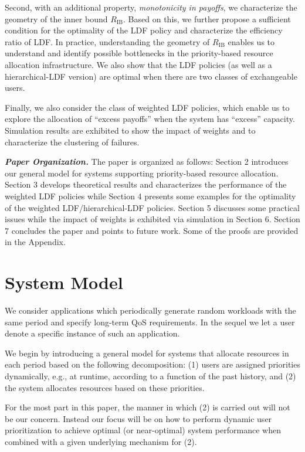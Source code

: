 \documentclass[prodmode,acmtompecs]{acmsmall}
\newcommand{\myComments}[1]{}
\newif\ifextended
\newcommand{\extendedStart}{\ifextended  \myComments{Extended version: }}
\newcommand{\commentEnd}{\myComments{End}}
\begin{document}
Second, with an additional property, {\em monotonicity in payoffs}, we characterize the geometry of the inner bound $R_\text{IB}$. 
Based on this, we further propose a sufficient condition for the optimality of the LDF policy and characterize the efficiency ratio of LDF. 
In practice, understanding the geometry of $R_\text{IB}$ enables us to understand and identify possible bottlenecks in the priority-based resource allocation infrastructure. 
We also show that the LDF policies (as well as a hierarchical-LDF version) are optimal when there are two classes of exchangeable users. 

Finally, we also consider the class of weighted LDF policies, which enable us to explore the allocation of ``excess payoffs'' when the system has ``excess'' capacity. Simulation results are exhibited to show the impact of weights and to characterize the clustering of failures. 

{\bf \em Paper Organization. }
The paper is organized as follows: Section 2 introduces our general model for systems supporting priority-based resource allocation. Section 3 develops theoretical results and characterizes the performance of the weighted LDF policies while Section 4 presents some examples for the optimality of the weighted LDF/hierarchical-LDF policies. Section 5 discusses some practical issues while the impact of weights is exhibited via simulation in Section 6. Section 7 concludes the paper and points to future work. Some of the proofs are provided in the Appendix.

\section{System Model}
\label{sec_system_model}
We consider applications which periodically generate random workloads with the same period and specify long-term QoS requirements. In the sequel we let a user denote a specific instance of such an application. 

We begin by introducing a general model for systems that allocate resources in each period based on the following decomposition: 
(1) users are assigned priorities dynamically, e.g., at runtime, according to a function of the past history, and (2) the system allocates resources based on these priorities. 

For the most part in this paper, the manner in which (2) is carried out will not be our concern. Instead our focus will be on how to perform dynamic user prioritization to achieve optimal (or near-optimal) system performance when combined with a given underlying mechanism for (2). 
\extendedStart
In our follow-up work \cite{DuD16S}, we consider a specific system model and study the combined design of (1) and (2). 
\commentEnd\fi
\end{document}
